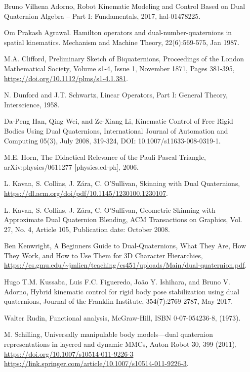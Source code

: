 \documentclass[12pt,reqno]{amsart}
\begin{document}
\begin{thebibliography}{99}

 Bruno Vilhena Adorno, Robot Kinematic Modeling and Control Based on Dual Quaternion Algebra -- Part I: Fundamentals, 2017, hal-01478225.

 Om Prakash Agrawal. Hamilton operators and dual-number-quaternions in spatial kinematics. Mechanism and Machine Theory, 22(6):569-575, Jan 1987.

 M.A. Clifford, Preliminary Sketch of Biquaternions, Proceedings of the London Mathematical Society, Volume s1-4, Issue 1, November 1871, Pages 381-395, \url{https://doi.org/10.1112/plms/s1-4.1.381}.

 N. Dunford and J.T. Schwartz, Linear Operators, Part I: General Theory, Interscience, 1958.

 Da-Peng Han, Qing Wei, and Ze-Xiang Li, Kinematic Control of Free Rigid Bodies Using Dual Quaternions, International Journal of Automation and Computing
05(3), July 2008, 319-324, DOI: 10.1007/s11633-008-0319-1.

 M.E. Horn, The Didactical Relevance of the Pauli Pascal Triangle, arXiv:physics/0611277 [physics.ed-ph], 2006.

 L. Kavan, S. Collins, J. \u Z\'ara, C. O'Sullivan, Skinning with Dual Quaternions, \url{https://dl.acm.org/doi/pdf/10.1145/1230100.1230107}.

 L. Kavan, S. Collins, J. \u Z\'ara, C. O'Sullivan, Geometric Skinning with Approximate Dual Quaternion Blending, ACM Transactions on Graphics, Vol. 27, No. 4, Article 105, Publication date: October 2008.

 Ben Kenwright, A Beginners Guide to Dual-Quaternions, What They Are, How They Work, and How to Use Them for 3D Character Hierarchies, \url{https://cs.gmu.edu/~jmlien/teaching/cs451/uploads/Main/dual-quaternion.pdf}.

 Hugo T.M. Kussaba, Luis F.C. Figueredo, Jo\~ao Y. Ishihara, and Bruno V. Adorno, Hybrid kinematic control for rigid body pose stabilization using dual quaternions, Journal of the Franklin Institute, 354(7):2769-2787, May 2017.

 Walter Rudin, Functional analysis, McGraw-Hill, ISBN 0-07-054236-8, (1973).

  M. Schilling, Universally manipulable body models---dual quaternion representations in layered and dynamic MMCs, Auton Robot 30, 399 (2011), \url{https://doi.org/10.1007/s10514-011-9226-3 https://link.springer.com/article/10.1007/s10514-011-9226-3}.


\end{thebibliography}
\end{document}
